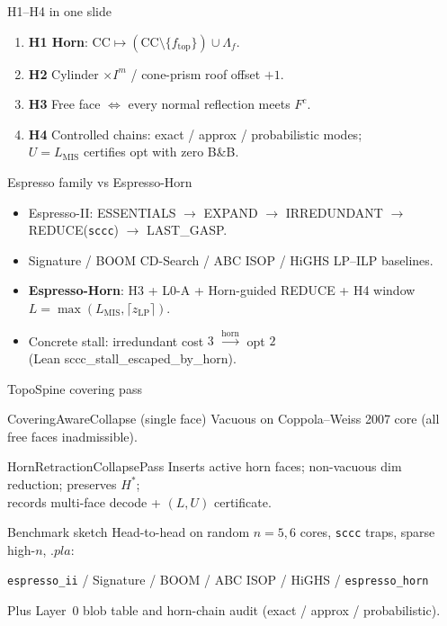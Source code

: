 \documentclass[aspectratio=169,11pt]{beamer}
\newcommand{\CC}{\mathrm{CC}}
\begin{document}
\begin{frame}{H1--H4 in one slide}
\begin{enumerate}
\item \textbf{H1 Horn}: $\CC\mapsto(\CC\setminus\{f_{\mathrm{top}}\})\cup\Lambda_f$.
\item \textbf{H2} Cylinder $\times I^m$ / cone-prism roof offset $+1$.
\item \textbf{H3} Free face $\Leftrightarrow$ every normal reflection meets $F^c$.
\item \textbf{H4} Controlled chains: exact / approx / probabilistic modes;\\
$U=L_{\mathrm{MIS}}$ certifies opt with zero B\&B.
\end{enumerate}
\end{frame}

\begin{frame}{Espresso family vs Espresso-Horn}
\begin{itemize}
\item Espresso-II: ESSENTIALS $\to$ EXPAND $\to$ IRREDUNDANT $\to$ REDUCE(\texttt{sccc}) $\to$ LAST\_GASP.
\item Signature / BOOM CD-Search / ABC ISOP / HiGHS LP--ILP baselines.
\item \textbf{Espresso-Horn}: H3 + L0-A + Horn-guided REDUCE + H4 window\\
$L=\max(L_{\mathrm{MIS}},\lceil z_{\mathrm{LP}}\rceil)$.
\item Concrete stall: irredundant cost $3$ $\xrightarrow{\text{horn}}$ opt $2$\\
(Lean \textsf{sccc\_stall\_escaped\_by\_horn}).
\end{itemize}
\end{frame}

\begin{frame}{TopoSpine covering pass}
\begin{block}{CoveringAwareCollapse (single face)}
Vacuous on Coppola--Weiss 2007 core (all free faces inadmissible).
\end{block}
\vspace{0.5em}
\begin{block}{HornRetractionCollapsePass}
Inserts active horn faces; non-vacuous dim reduction; preserves $H^*$;\\
records multi-face decode + $(L,U)$ certificate.
\end{block}
\end{frame}

\begin{frame}{Benchmark sketch}
Head-to-head on random $n=5,6$ cores, \texttt{sccc} traps, sparse high-$n$,
$.pla$:
\begin{center}
\texttt{espresso\_ii} / Signature / BOOM / ABC ISOP / HiGHS / \texttt{espresso\_horn}
\end{center}
\vspace{0.5em}
Plus Layer~0 blob table and horn-chain audit (exact / approx / probabilistic).
\end{frame}
\end{document}
